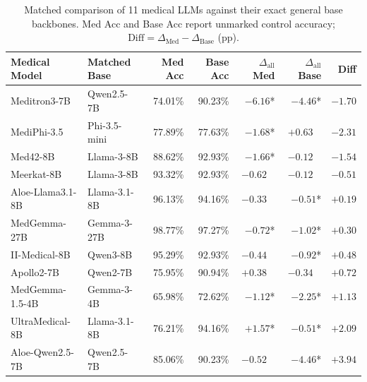 \documentclass[11pt]{article}
\begin{document}
\begin{table}[ht]
\centering
\scriptsize
\setlength{\tabcolsep}{2.5pt}
\begin{tabular}{@{}llrrrrr@{}}
\toprule
\textbf{Medical Model} & \textbf{Matched Base} & \textbf{Med Acc} & \textbf{Base Acc} & \textbf{$\Delta_{\text{all}}$ Med} & \textbf{$\Delta_{\text{all}}$ Base} & \textbf{Diff} \\
\midrule
Meditron3-7B & Qwen2.5-7B & 74.01\% & 90.23\% & $-6.16$* & $-4.46$* & $-1.70$ \\
MediPhi-3.5 & Phi-3.5-mini & 77.89\% & 77.63\% & $-1.68$* & $+0.63\phantom{*}$ & $-2.31$ \\
Med42-8B & Llama-3-8B & 88.62\% & 92.93\% & $-1.66$* & $-0.12\phantom{*}$ & $-1.54$ \\
Meerkat-8B & Llama-3-8B & 93.32\% & 92.93\% & $-0.62\phantom{*}$ & $-0.12\phantom{*}$ & $-0.51$ \\
\midrule
Aloe-Llama3.1-8B & Llama-3.1-8B & 96.13\% & 94.16\% & $-0.33\phantom{*}$ & $-0.51$* & $+0.19$ \\
MedGemma-27B & Gemma-3-27B & 98.77\% & 97.27\% & $-0.72$* & $-1.02$* & $+0.30$ \\
II-Medical-8B & Qwen3-8B & 95.29\% & 92.93\% & $-0.44\phantom{*}$ & $-0.92$* & $+0.48$ \\
Apollo2-7B & Qwen2-7B & 75.95\% & 90.94\% & $+0.38\phantom{*}$ & $-0.34\phantom{*}$ & $+0.72$ \\
MedGemma-1.5-4B & Gemma-3-4B & 65.98\% & 72.62\% & $-1.12$* & $-2.25$* & $+1.13$ \\
UltraMedical-8B & Llama-3.1-8B & 76.21\% & 94.16\% & $+1.57$* & $-0.51$* & $+2.09$ \\
Aloe-Qwen2.5-7B & Qwen2.5-7B & 85.06\% & 90.23\% & $-0.52\phantom{*}$ & $-4.46$* & $+3.94$ \\
\bottomrule
\end{tabular}
\caption{Matched comparison of 11 medical LLMs against their exact general base backbones. Med Acc and Base Acc report unmarked control accuracy; $\text{Diff} = \Delta_{\text{Med}} - \Delta_{\text{Base}}$ (pp).}
\label{tab:med_vs_base}
\end{table}
\end{document}
